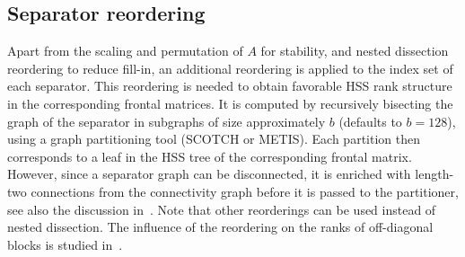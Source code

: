 \documentclass{article}
\begin{document}
\subsection{Separator reordering}\label{sec:sep_reorder}
Apart from the scaling and permutation of $A$ for stability, and
nested dissection reordering to reduce fill-in, an additional
reordering is applied to the index set of each separator. This
reordering is needed to obtain favorable HSS rank structure in the
corresponding frontal matrices. It is computed by recursively
bisecting the graph of the separator in subgraphs of size
approximately $b$ (defaults to $b=128$), using a graph partitioning
tool (SCOTCH or METIS). Each partition then corresponds to a leaf in
the HSS tree of the corresponding frontal matrix. However, since a
separator graph can be disconnected, it is enriched with length-two
connections from the connectivity graph before it is passed to the
partitioner, see also the discussion
in~\cite{napov2013algebraic}. Note that other reorderings can be used
instead of nested dissection. The influence of the reordering on the
ranks of off-diagonal blocks is studied
in~\cite{weisbecker2013improving}.
\end{document}
